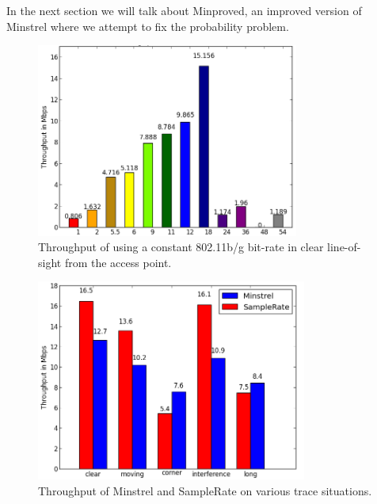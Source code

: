 \documentclass[letterpaper,twocolumn,10pt]{article}
\begin{document}
In the next section we will talk about Minproved, an improved version of Minstrel where we attempt to fix the probability problem. 

\begin{figure}[htb]
  \hspace{-1em}\includegraphics[width=3.4in]{constant.png}\vspace{-0em}
  \caption{Throughput of using a constant 802.11b/g bit-rate in clear line-of-sight from the access point.}
\label{figure:2}
\end{figure}


\begin{figure}[htb]
  \hspace{-.75em}\includegraphics[width=3.5in]{MinVSSam1.png}\vspace{-0.75em}
  \caption{Throughput of Minstrel and SampleRate on various trace situations.}
\label{figure:3}
\end{figure}
\end{document}

